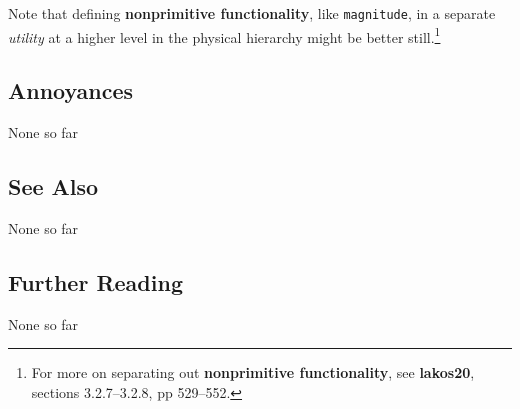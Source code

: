 \noindent Note that defining \textbf{nonprimitive functionality}, like
\texttt{magnitude}, in a separate \emph{utility} at a higher level in the
physical hierarchy might be better still.{\cprotect\footnote{For more on
separating out \textbf{nonprimitive functionality}, see
\textbf{{lakos20}}, sections 3.2.7--3.2.8, pp 529--552.}}

\subsection[Annoyances]{Annoyances}\label{annoyances}

None so far

\subsection[See Also]{See Also}\label{see-also}

None so far

\subsection[Further Reading]{Further Reading}\label{further-reading}

None so far

